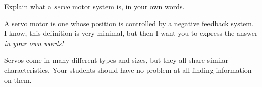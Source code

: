 

Explain what a {\it servo} motor system is, in your own words.







A servo motor is one whose position is controlled by a negative feedback system.  I know, this definition is very minimal, but then I want you to express the answer {\it in your own words!}







Servos come in many different types and sizes, but they all share similar characteristics.  Your students should have no problem at all finding information on them.




